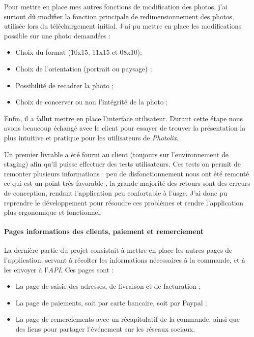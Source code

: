 \documentclass[12pt,a4paper]{article}
\providecommand{\tightlist}{%
  \setlength{\itemsep}{0pt}\setlength{\parskip}{0pt}}
\begin{document}
  \bigskip

  Pour mettre en place mes autres fonctions de modification des photos,
  j'ai surtout dû modifier la fonction principale de redimensionnement des
  photos, utilisée lors du téléchargement initial. J'ai pu mettre en place
  les modifications possible sur une photo demandées :

  \begin{itemize}
  \tightlist
  \item
    Choix du format (10x15, 11x15 et 08x10);
  \item
    Choix de l'orientation (portrait ou paysage) ;
  \item
    Possibilité de recadrer la photo ;
  \item
    Choix de concerver ou non l'intégrité de la photo ;
  \end{itemize}

  \bigskip

  Enfin, il a fallut mettre en place l'interface utilisateur. Durant cette
  étape nous avons beaucoup échangé avec le client pour essayer de trouver
  la présentation la plus intuitive et pratique pour les utilisateurs de
  \emph{Photolix}.

  Un premier livrable a été fourni au client (toujours sur l'environnement
  de staging) afin qu'il puisse effectuer des tests utilisateurs. Ces
  tests on permit de remonter plusieurs informations : peu de
  disfonctionnement nous ont été remonté ce qui est un point très
  favorable , la grande majorité des retours sont des erreurs de
  conception, rendant l'application peu confortable à l'usge. J'ai donc pu
  reprendre le développement pour résoudre ces problèmes et rendre
  l'application plus ergonomique et fonctionnel.

  \paragraph{Pages informations des clients, paiement et
  remerciement}\label{pages-informations-des-clients-paiement-et-remerciement}

  \bigskip

  La dernière partie du projet consistait à mettre en place les autres
  pages de l'application, servant à récolter les informations nécessaires
  à la commande, et à les envoyer à l'\emph{API}. Ces pages sont :

  \begin{itemize}
  \tightlist
  \item
    La page de saisie des adresses, de livraison et de facturation ;
  \item
    La page de paiements, soit par carte bancaire, soit par Paypal ;
  \item
    La page de remerciements avec un récapitulatif de la commande, ainsi
    que des liens pour partager l'événement sur les réseaux sociaux.
  \end{itemize}
\end{document}
